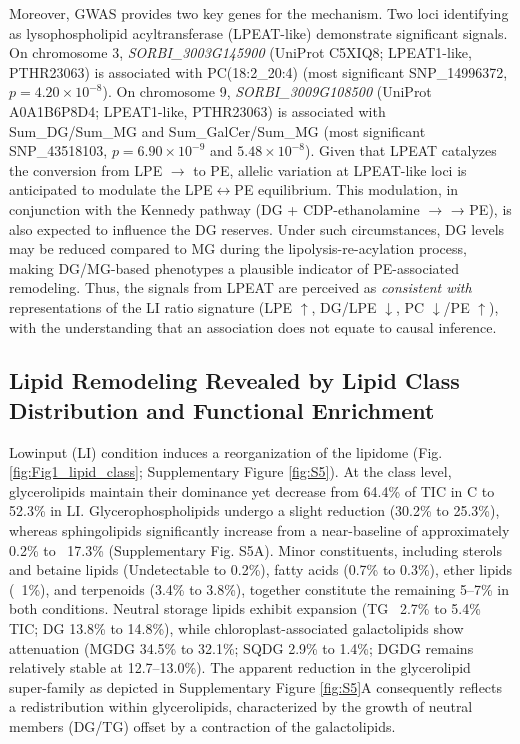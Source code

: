 \documentclass[10pt,letterpaper]{article}
\begin{document}
\begin{itemize}
Moreover, GWAS provides two key genes for the mechanism. Two loci identifying as lysophospholipid acyltransferase (LPEAT-like) demonstrate significant signals. On chromosome 3, \textit{SORBI\_3003G145900} (UniProt C5XIQ8; LPEAT1-like, PTHR23063) is associated with PC(18:2\_20:4) (most significant SNP\_14996372, $p = 4.20 \times 10^{-8}$). On chromosome 9, \textit{SORBI\_3009G108500} (UniProt A0A1B6P8D4; LPEAT1-like, PTHR23063) is associated with Sum\_DG/Sum\_MG and Sum\_GalCer/Sum\_MG (most significant SNP\_43518103, $p = 6.90 \times 10^{-9}$ and $5.48 \times 10^{-8}$). Given that LPEAT catalyzes the conversion from LPE $\rightarrow$ to PE, allelic variation at LPEAT-like loci is anticipated to modulate the LPE$\leftrightarrow$PE equilibrium. This modulation, in conjunction with the Kennedy pathway (DG + CDP-ethanolamine $\rightarrow$ → PE), is also expected to influence the DG reserves. Under such circumstances, DG levels may be reduced compared to MG during the lipolysis-re-acylation process, making DG/MG-based phenotypes a plausible indicator of PE-associated remodeling. Thus, the signals from LPEAT are perceived as \emph{consistent with} representations of the LI ratio signature (LPE $\uparrow$, DG/LPE $\downarrow$, PC $\downarrow$/PE $\uparrow$), with the understanding that an association does not equate to causal inference.




\subsection*{Lipid Remodeling Revealed by Lipid Class Distribution and Functional Enrichment}
Lowinput (LI) condition induces a reorganization of the lipidome (Fig.\ref{fig:Fig1_lipid_class}; Supplementary Figure \ref{fig:S5}). At the class level, glycerolipids maintain their dominance yet decrease from 64.4\% of TIC in C to 52.3\% in LI. Glycerophospholipids undergo a slight reduction (30.2\% to 25.3\%), whereas sphingolipids significantly increase from a near-baseline of approximately 0.2\% to ~17.3\% (Supplementary Fig. S5A). Minor constituents, including sterols and betaine lipids (Undetectable to 0.2\%), fatty acids (0.7\% to 0.3\%), ether lipids (~1\%), and terpenoids (3.4\% to 3.8\%), together constitute the remaining 5–7\% in both conditions. Neutral storage lipids exhibit expansion (TG ~2.7\% to 5.4\% TIC; DG 13.8\% to 14.8\%), while chloroplast-associated galactolipids show attenuation (MGDG 34.5\% to 32.1\%; SQDG 2.9\% to 1.4\%; DGDG remains relatively stable at 12.7–13.0\%). The apparent reduction in the glycerolipid super-family as depicted in Supplementary Figure \ref{fig:S5}A consequently reflects a redistribution within glycerolipids, characterized by the growth of neutral members (DG/TG) offset by a contraction of the galactolipids.


\end{itemize}
\end{document}

